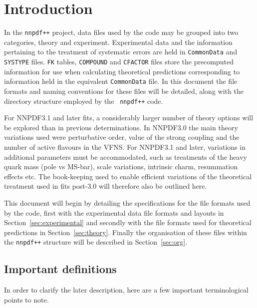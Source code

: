 \documentclass[11pt]{article}
\begin{document}
\clearpage

\section{Introduction}

In the {\tt nnpdf++} project, data files used by the code may be grouped into
two categories, theory and experiment. Experimental data and the information
pertaining to the treatment of systematic errors are held in {\tt CommonData}
and {\tt SYSTYPE} files. {\tt FK} tables, {\tt COMPOUND} and {\tt CFACTOR} files
store the precomputed information for use when calculating theoretical
predictions corresponding to information held in the equivalent {\tt CommonData}
file. In this document the file formats and naming conventions for these files
will be detailed, along with the directory structure employed by the {\tt
nnpdf++} code.

For NNPDF3.1 and later fits, a considerably larger number of theory options will
be explored than in previous determinations. In NNPDF3.0 the main theory
variations used were perturbative order, value of the strong coupling and the
number of active flavours in the VFNS\@. For NNPDF3.1 and later, variations in
additional parameters must be accommodated, such as treatments of the heavy
quark mass (pole vs MS-bar), scale variations,  intrinsic charm, resummation
effects etc. The book-keeping used to enable efficient variations of the
theoretical treatment used in fits post-3.0 will therefore also be outlined
here.

This document will begin by detailing the specifications for the file formats
used by the code, first with the experimental data file formats and layouts in
Section~\ref{sec:experimental} and secondly with the file formats used for
theoretical predictions in Section~\ref{sec:theory}. Finally the organisation of
these files within the {\tt nnpdf++} structure will be described in
Section~\ref{sec:org}.

\subsection{Important definitions}
In order to clarify the later description, here are a few important
terminological points to note.
\end{document}

